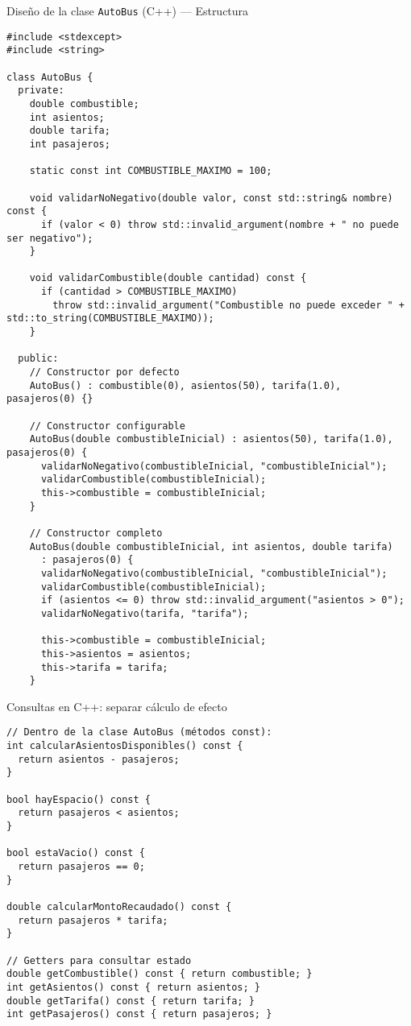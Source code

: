 \documentclass[aspectratio=169]{beamer}
\begin{document}
\begin{frame}[fragile]{Diseño de la clase \texttt{AutoBus} (C++) — Estructura}
\lstset{style=cppstyle}
\begin{lstlisting}
#include <stdexcept>
#include <string>

class AutoBus {
  private:
    double combustible;
    int asientos;
    double tarifa;
    int pasajeros;
    
    static const int COMBUSTIBLE_MAXIMO = 100;
    
    void validarNoNegativo(double valor, const std::string& nombre) const {
      if (valor < 0) throw std::invalid_argument(nombre + " no puede ser negativo");
    }
    
    void validarCombustible(double cantidad) const {
      if (cantidad > COMBUSTIBLE_MAXIMO) 
        throw std::invalid_argument("Combustible no puede exceder " + std::to_string(COMBUSTIBLE_MAXIMO));
    }

  public:
    // Constructor por defecto
    AutoBus() : combustible(0), asientos(50), tarifa(1.0), pasajeros(0) {}
    
    // Constructor configurable
    AutoBus(double combustibleInicial) : asientos(50), tarifa(1.0), pasajeros(0) {
      validarNoNegativo(combustibleInicial, "combustibleInicial");
      validarCombustible(combustibleInicial);
      this->combustible = combustibleInicial;
    }
    
    // Constructor completo
    AutoBus(double combustibleInicial, int asientos, double tarifa) 
      : pasajeros(0) {
      validarNoNegativo(combustibleInicial, "combustibleInicial");
      validarCombustible(combustibleInicial);
      if (asientos <= 0) throw std::invalid_argument("asientos > 0");
      validarNoNegativo(tarifa, "tarifa");
      
      this->combustible = combustibleInicial;
      this->asientos = asientos;
      this->tarifa = tarifa;
    }
\end{lstlisting}
\end{frame}

\begin{frame}[fragile]{Consultas en C++: separar cálculo de efecto}
\lstset{style=cppstyle}
\begin{lstlisting}
// Dentro de la clase AutoBus (métodos const):
int calcularAsientosDisponibles() const {
  return asientos - pasajeros;
}

bool hayEspacio() const {
  return pasajeros < asientos;
}

bool estaVacio() const {
  return pasajeros == 0;
}

double calcularMontoRecaudado() const {
  return pasajeros * tarifa;
}

// Getters para consultar estado
double getCombustible() const { return combustible; }
int getAsientos() const { return asientos; }
double getTarifa() const { return tarifa; }
int getPasajeros() const { return pasajeros; }
\end{lstlisting}
\end{frame}
\end{document}
